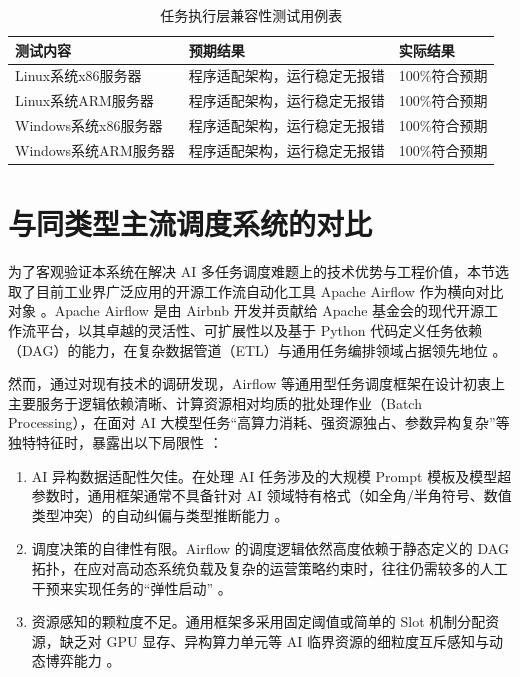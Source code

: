 \begin {table}[htbp]
\centering
\caption {任务执行层兼容性测试用例表}
\begin {tabular}{lll}
\toprule
测试内容 & 预期结果 & 实际结果 \\
\midrule
Linux系统x86服务器 & 程序适配架构，运行稳定无报错 &  100\%符合预期 \\
Linux系统ARM服务器 & 程序适配架构，运行稳定无报错 &  100\%符合预期 \\
Windows系统x86服务器 & 程序适配架构，运行稳定无报错 &  100\%符合预期 \\
Windows系统ARM服务器 & 程序适配架构，运行稳定无报错 &  100\%符合预期 \\
\bottomrule
\end {tabular}
\label {tab:my_label}
\end {table}

\section{与同类型主流调度系统的对比}

为了客观验证本系统在解决 AI 多任务调度难题上的技术优势与工程价值，本节选取了目前工业界广泛应用的开源工作流自动化工具 Apache Airflow 作为横向对比对象 。Apache Airflow 是由 Airbnb 开发并贡献给 Apache 基金会的现代开源工作流平台，以其卓越的灵活性、可扩展性以及基于 Python 代码定义任务依赖（DAG）的能力，在复杂数据管道（ETL）与通用任务编排领域占据领先地位 。

然而，通过对现有技术的调研发现，Airflow 等通用型任务调度框架在设计初衷上主要服务于逻辑依赖清晰、计算资源相对均质的批处理作业（Batch Processing），在面对 AI 大模型任务“高算力消耗、强资源独占、参数异构复杂”等独特特征时，暴露出以下局限性 ：

\begin{enumerate}
    \item AI 异构数据适配性欠佳。在处理 AI 任务涉及的大规模 Prompt 模板及模型超参数时，通用框架通常不具备针对 AI 领域特有格式（如全角/半角符号、数值类型冲突）的自动纠偏与类型推断能力 。
    \item 调度决策的自律性有限。Airflow 的调度逻辑依然高度依赖于静态定义的 DAG 拓扑，在应对高动态系统负载及复杂的运营策略约束时，往往仍需较多的人工干预来实现任务的“弹性启动” 。
    \item 资源感知的颗粒度不足。通用框架多采用固定阈值或简单的 Slot 机制分配资源，缺乏对 GPU 显存、异构算力单元等 AI 临界资源的细粒度互斥感知与动态博弈能力 。
\end{enumerate}

